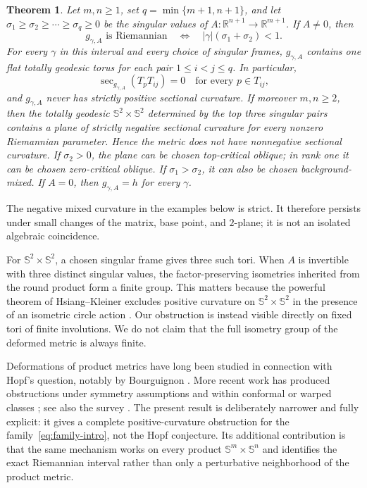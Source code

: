 \documentclass[11pt]{amsart}
\newtheorem{theorem}{Theorem}[section]
\theoremstyle{definition}
\theoremstyle{remark}
\DeclareMathOperator{\secop}{sec}
\newcommand{\R}{\mathbb R}
\newcommand{\Sph}{\mathbb S}
\begin{document}
\begin{theorem}\label{thm:main}
Let $m,n\geq1$, set
$q=\min\{m+1,n+1\}$, and let
$\sigma_1\geq\sigma_2\geq\cdots\geq\sigma_q\geq0$ be the singular
values of $A:\R^{n+1}\to\R^{m+1}$.  If $A\neq0$, then
\[
 g_{\gamma,A}\text{ is Riemannian}
 \quad\Longleftrightarrow\quad
 |\gamma|(\sigma_1+\sigma_2)<1.
\]
For every $\gamma$ in this interval and every choice of singular
frames, $g_{\gamma,A}$ contains one flat totally geodesic torus for
each pair $1\leq i<j\leq q$.  In particular,
\[
 \secop_{g_{\gamma,A}}(T_pT_{ij})=0
 \quad\text{for every }p\in T_{ij},
\]
and $g_{\gamma,A}$ never has strictly positive sectional curvature.
If moreover $m,n\geq2$, then the totally geodesic
$\Sph^2\times\Sph^2$ determined by the top three singular pairs
contains a plane of strictly negative sectional curvature for every
nonzero Riemannian parameter.  Hence the metric does not have
nonnegative sectional curvature.  If $\sigma_2>0$, the plane can be
chosen top-critical oblique; in rank one it can be chosen
zero-critical oblique.  If $\sigma_1>\sigma_2$, it can also be chosen
background-mixed.
If $A=0$, then $g_{\gamma,A}=h$ for every $\gamma$.
\end{theorem}

The negative mixed curvature in the examples below is strict.  It
therefore persists under small changes of the matrix, base point, and
$2$-plane; it is not an isolated algebraic coincidence.

For $\Sph^2\times\Sph^2$, a chosen singular frame gives three such
tori.  When $A$ is invertible with three distinct singular values, the
factor-preserving isometries inherited from the round product form a
finite group.  This matters because the powerful theorem of
Hsiang--Kleiner excludes positive curvature on
$\Sph^2\times\Sph^2$ in the presence of an isometric circle action
\cite{HsiangKleiner1989}.  Our obstruction is instead visible directly
on fixed tori of finite involutions.  We do not claim that the full
isometry group of the deformed metric is always finite.

Deformations of product metrics have long been studied in connection
with Hopf's question, notably by Bourguignon
\cite{Bourguignon1975,BourguignonDeschampsSentenac1973}.  More recent
work has produced obstructions under symmetry assumptions
\cite{HsiangKleiner1989,AmannKennard2017} and within conformal or warped
classes \cite{SeckNiangMasiello2022}; see also the survey
\cite{Amann2021}.  The present result is deliberately narrower and
fully explicit: it gives a complete positive-curvature obstruction
for the family~\eqref{eq:family-intro}, not the Hopf conjecture.  Its
additional contribution is that the same
mechanism works on every product $\Sph^m\times\Sph^n$ and identifies
the exact Riemannian interval rather than only a perturbative
neighborhood of the product metric.
\end{document}

